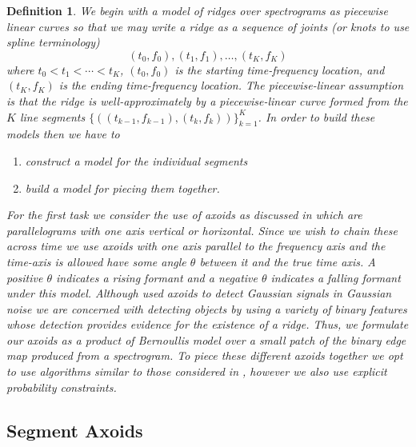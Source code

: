 \documentclass[english]{article}
\newtheorem{defn}{Definition}[section]
\begin{document}
\begin{defn}
We begin with a model of ridges over spectrograms as piecewise
linear curves so that we may write a ridge as a sequence of joints
 (or knots to use spline terminology) 
\begin{equation}\label{eq:formant-spline-knots}
(t_0,f_0),(t_1,f_1),\ldots,(t_K,f_K)
\end{equation}
where $t_0 <t_1<\cdots <t_K$, $(t_0,f_0)$ is the starting time-frequency location, and
$(t_K,f_K)$ is the ending time-frequency location.  The piecewise-linear
assumption is that the ridge is well-approximately by a piecewise-linear curve
formed from the $K$ line segments $\{((t_{k-1},f_{k-1}),(t_k,f_k))\}_{k=1}^K$.  In order to build these models then we have to 
\begin{enumerate}
\item construct a model for the individual segments
\item build a model for piecing them together.
\end{enumerate} 
For the first task we consider the use of axoids as discussed
in \cite{arias2005near} which are parallelograms with one axis
vertical or horizontal.  Since we wish to chain these across time
we use axoids with one axis parallel to the frequency axis and the
time-axis is allowed have some angle $\theta$ between it
and the true time axis.  A positive $\theta$ indicates a rising formant
and a negative $\theta$ indicates a falling formant under this
model.  Although \cite{arias2005near} used axoids to detect
Gaussian signals in Gaussian noise we are concerned with detecting
objects by using a variety of binary features whose detection
provides evidence for the existence of a ridge. Thus, we formulate
our axoids as a product of Bernoullis model over a small patch
of the binary edge map produced from a spectrogram.
To piece these different axoids together we opt to use algorithms
similar to those considered in \cite{candes2006detecting},
however we also use explicit probability constraints.

\subsection{Segment Axoids}


\end{defn}
\end{document}
